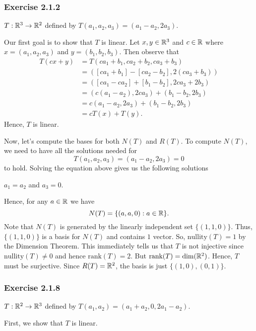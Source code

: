 \subsubsection{Exercise 2.1.2} \( T: \mathbb{R}^{3} \to \mathbb{R}^{2}  \) defined by \( T(a_{1}, a_{2}, a_{3}) = (a_{1} - a_{2}, 2a_{3}) \).
\begin{solution}
  Our first goal is to show that \( T  \) is linear. Let \( x,y \in \mathbb{R}^{3} \) and \( c \in \mathbb{R} \) where \( x = (a_{1}, a_{2}, a_{3}) \) and \( y = (b_{1}, b_{2}, b_{3}) \). Then observe that   
  \begin{align*}
      T(cx +y) &= T(ca_{1} + b_{1}, ca_{2} + b_{2}, ca_{3} + b_{3}) \\
               &= ( [ ca_{1} + b_{1}] - [ca_{2} - b_{2}], 2(ca_{3} + b_{3})) \\
               &= ([ca_{1} - ca_{2}] + [b_{1} - b_{2}], 2ca_{3} + 2b_{3}) \\
               &= (c(a_{1} - a_{2}), 2ca_{3}) + (b_{1} - b_{2}, 2b_{3}) \\
               &= c(a_{1} -a_{2}, 2a_{3}) + (b_{1} - b_{2}, 2b_{3}) \\
               &= cT(x) + T(y).
  \end{align*}
  Hence, \( T  \) is linear.

  Now, let's compute the bases for both \( N(T)  \) and \( R(T) \). To compute \( N(T) \), we need to have all the solutions needed for
  \[ T(a_{1}, a_{2}, a_{3}) = (a_{1} - a_{2}, 2a_{3}) = 0   \]
  to hold. Solving the equation above gives us the following solutions
  \begin{center}
      \( a_{1} = a_{2} \) and \( a_{3} = 0  \).
  \end{center}
  Hence, for any \( a \in \mathbb{R}  \) we have
  \[  N(T) = \{ (a,a,0) : a \in \mathbb{R}  \}. \]
  Note that \( N(T)  \) is generated by the linearly independent set \( \{ (1,1,0) \}  \).  Thus, \( \{ (1,1,0)  \}  \) is a basis for \( N(T) \) and contains \( 1  \) vector. So, \( \text{nullity}(T) = 1  \) by the Dimension Theorem. This immediately tells us that \( T \) is not injective since \( \text{nullity}(T) \neq 0  \) and hence \( \text{rank}(T) = 2  \). But \( \text{rank}(T) = \text{dim}(\mathbb{R}^{2}) \). Hence, \( T \) must be surjective. Since \( R(T) = \mathbb{R}^{2} \), the basis is just \( \{ (1,0), (0,1) \}  \).
\end{solution}

\subsubsection{Exercise 2.1.8} \( T: \mathbb{R}^{2} \to \mathbb{R}^{3}  \) defined by \( T(a_{1},a_{2}) = (a_{1} + a_{2}, 0, 2a_{1} - a_{2}) \).
\begin{solution}
   First, we show that \( T  \) is linear.     
\end{solution}



